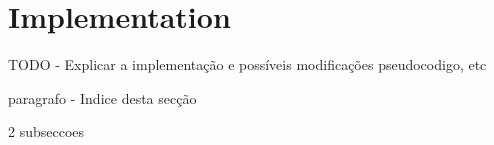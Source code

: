 \section{Implementation}
TODO - Explicar a implementação e possíveis modificações
pseudocodigo, etc

paragrafo - Indice desta secção

2 subseccoes
